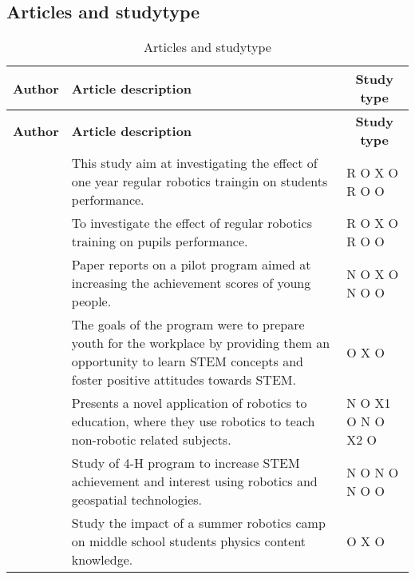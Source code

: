 \subsection*{Articles and studytype}
\setlength\LTleft{0px}
\setlength\LTright{0px}
\begin{longtable}{@{\extracolsep{\fill}}p{}p{}p{}}
	
	
	\hline \multicolumn{1}{l}{\textbf{Author}} & \multicolumn{1}{l}{\textbf{Article description}} & \multicolumn{1}{c}{\textbf{Study type	}} \\ \hline\hline
	\endfirsthead
	\hline\multicolumn{1}{l}{\textbf{Author}} & \multicolumn{1}{l}{\textbf{Article description}} & \multicolumn{1}{c}{\textbf{Study type	}} \\ \hline\hline
	\endhead
	\hline \caption{Articles and studytype}\endlastfoot
	\tcite{hussain2006effect} & This study aim at investigating the effect of one year regular robotics traingin on students performance. & R O X O R O O\\\hline
	\tcite{lindh2007does} & To investigate the effect of regular robotics training on pupils performance. & R O X O R O O\\\hline
	\tcite{barker2007robotics}& Paper reports on a pilot program aimed at increasing the achievement scores of young people. & N O X O N O O\\\hline
	\tcite{nugent2009use} & The goals of the program were to prepare youth for the workplace by providing them an opportunity to learn STEM concepts and foster positive attitudes towards STEM. & O X O\\\hline
	\tcite{mitnik2008autonomous} & Presents a novel application of robotics to education, where they use robotics to teach non-robotic related subjects. & N O X1 O N O X2 O\\\hline
	\tcite{nugent2008effect} & Study of 4-H program to increase STEM achievement and interest using robotics and geospatial technologies. & N O N O N O O\\\hline
	\tcite{williams2007acquisition} & Study the impact of a summer robotics camp on middle school students physics content knowledge.  & O X O\\\hline
\end{longtable}
